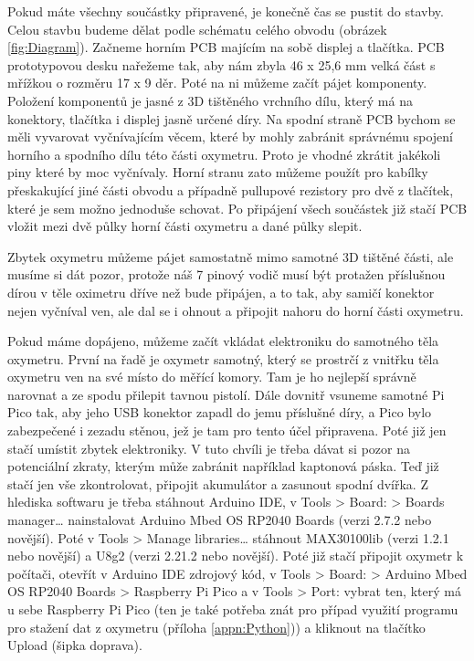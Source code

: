 \par Pokud máte všechny součástky připravené, je konečně čas se pustit do stavby. Celou stavbu budeme dělat podle schématu celého obvodu (obrázek \ref{fig:Diagram}). Začneme horním PCB majícím na sobě displej a tlačítka. PCB prototypovou desku nařežeme tak, aby nám zbyla 46 x 25,6 mm velká část s mřížkou o rozměru 17 x 9 děr. Poté na ni můžeme začít pájet komponenty. Položení komponentů je jasné z 3D tištěného vrchního dílu, který má na konektory, tlačítka i displej jasně určené díry. Na spodní straně PCB bychom se měli vyvarovat vyčnívajícím věcem, které by mohly zabránit správnému spojení horního a spodního dílu této části oxymetru. Proto je vhodné zkrátit jakékoli piny které by moc vyčnívaly. Horní stranu zato můžeme použít pro kabílky přeskakující jiné části obvodu a případně pullupové rezistory pro dvě z tlačítek, které je sem možno jednoduše schovat. Po připájení všech součástek již stačí PCB vložit mezi dvě půlky horní části oxymetru a dané půlky slepit.
\par Zbytek oxymetru můžeme pájet samostatně mimo samotné 3D tištěné části, ale musíme si dát pozor, protože náš 7 pinový vodič musí být protažen příslušnou dírou v těle oximetru dříve než bude připájen, a to tak, aby samičí konektor nejen vyčníval ven, ale dal se i ohnout a připojit nahoru do horní části oxymetru.
\par Pokud máme dopájeno, můžeme začít vkládat elektroniku do samotného těla oxymetru. První na řadě je oxymetr samotný, který se prostrčí z vnitřku těla oxymetru ven na své místo do měřící komory. Tam je ho nejlepší správně narovnat a ze spodu přilepit tavnou pistolí. Dále dovnitř vsuneme samotné Pi Pico tak, aby jeho USB konektor zapadl do jemu příslušné díry, a Pico bylo zabezpečené i zezadu stěnou, jež je tam pro tento účel připravena. Poté již jen stačí umístit zbytek elektroniky. V tuto chvíli je třeba dávat si pozor na potenciální zkraty, kterým může zabránit například kaptonová páska. Teď již stačí jen vše zkontrolovat, připojit akumulátor a zasunout spodní dvířka.
Z hlediska softwaru je třeba stáhnout Arduino IDE, v Tools > Board: > Boards manager… nainstalovat Arduino Mbed OS RP2040 Boards (verzi 2.7.2 nebo novější). Poté v Tools > Manage libraries… stáhnout MAX30100lib (verzi 1.2.1 nebo novější) a U8g2 (verzi 2.21.2 nebo novější). Poté již stačí připojit oxymetr k počítači, otevřít v Arduino IDE zdrojový kód, v Tools > Board: > Arduino Mbed OS RP2040 Boards > Raspberry Pi Pico a v Tools > Port: vybrat ten, který má u sebe Raspberry Pi Pico (ten je také potřeba znát pro případ využití programu pro stažení dat z oxymetru (příloha \ref{appn:Python})) a kliknout na tlačítko Upload (šipka doprava).